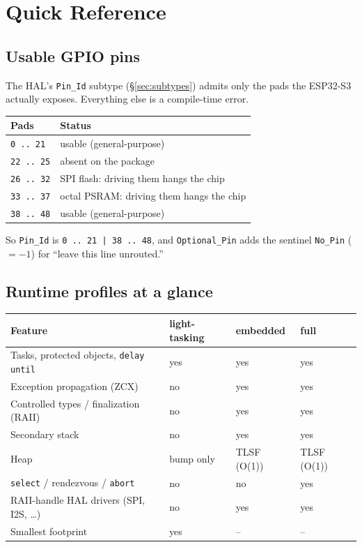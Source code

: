 \chapter{Quick Reference}
\label{ch:appendix}

\section{Usable GPIO pins}
\label{app:pins}

The HAL's \texttt{Pin\_Id} subtype (\S\ref{sec:subtypes}) admits only the pads the
ESP32-S3 actually exposes. Everything else is a compile-time error.

\begin{center}
\begin{tabular}{l l}
\toprule
\textbf{Pads} & \textbf{Status} \\ \midrule
\texttt{0 .. 21}   & usable (general-purpose) \\
\texttt{22 .. 25}  & absent on the package \\
\texttt{26 .. 32}  & SPI flash: driving them hangs the chip \\
\texttt{33 .. 37}  & octal PSRAM: driving them hangs the chip \\
\texttt{38 .. 48}  & usable (general-purpose) \\
\bottomrule
\end{tabular}
\end{center}

So \texttt{Pin\_Id} is \texttt{0\,..\,21 | 38\,..\,48}, and \texttt{Optional\_Pin}
adds the sentinel \texttt{No\_Pin} ($=-1$) for ``leave this line unrouted.''

\section{Runtime profiles at a glance}
\label{app:profiles}

\begin{center}
\begin{tabular}{l l l l}
\toprule
\textbf{Feature} & \textbf{light-tasking} & \textbf{embedded} & \textbf{full} \\ \midrule
Tasks, protected objects, \texttt{delay until} & yes & yes & yes \\
Exception propagation (ZCX)        & no  & yes & yes \\
Controlled types / finalization (RAII) & no & yes & yes \\
Secondary stack                    & no  & yes & yes \\
Heap                               & bump only & TLSF (O(1)) & TLSF (O(1)) \\
\texttt{select} / rendezvous / \texttt{abort} & no & no & yes \\
RAII-handle HAL drivers (SPI, I2S, \ldots) & no & yes & yes \\
Smallest footprint                 & yes & -- & -- \\
\bottomrule
\end{tabular}
\end{center}

